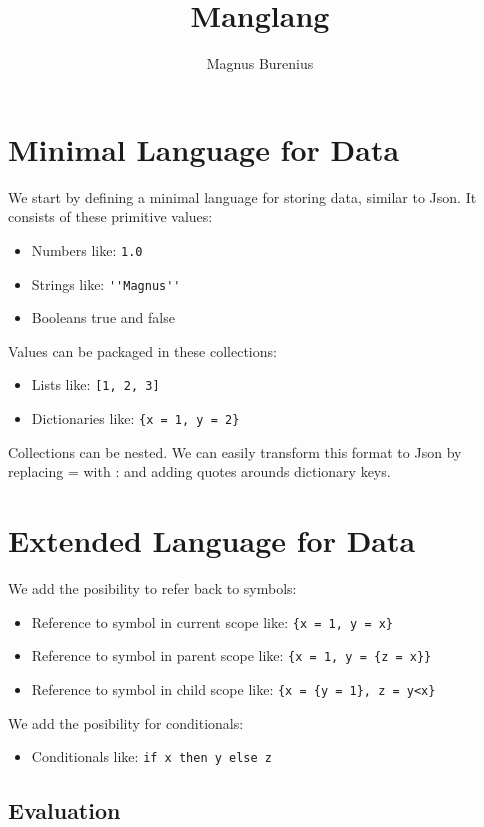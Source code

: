 \documentclass[a4paper,12pt]{article}
\title{Manglang}
\author{Magnus Burenius}
\begin{document}
\maketitle

\section{Minimal Language for Data}

We start by defining a minimal language for storing data, similar to Json. It consists of these primitive values:
\begin{itemize}
\item Numbers like: \lstinline|1.0|
\item Strings like: \lstinline|''Magnus''|
\item Booleans true and false
\end{itemize}
Values can be packaged in these collections:
\begin{itemize}
\item Lists like: \lstinline|[1, 2, 3]|
\item Dictionaries like: \lstinline|{x = 1, y = 2}|
\end{itemize}
Collections can be nested. We can easily transform this format to Json by replacing = with : and adding quotes arounds dictionary keys.

\section{Extended Language for Data}

We add the posibility to refer back to symbols:
\begin{itemize}
\item Reference to symbol in current scope like: \lstinline|{x = 1, y = x}|
\item Reference to symbol in parent scope like:  \lstinline|{x = 1, y = {z = x}}|
\item Reference to symbol in child scope like:  \lstinline|{x = {y = 1}, z = y<x}|
\end{itemize}
We add the posibility for conditionals:
\begin{itemize}
\item Conditionals like: \lstinline|if x then y else z|
\end{itemize}

\subsection{Evaluation}
\end{document}
